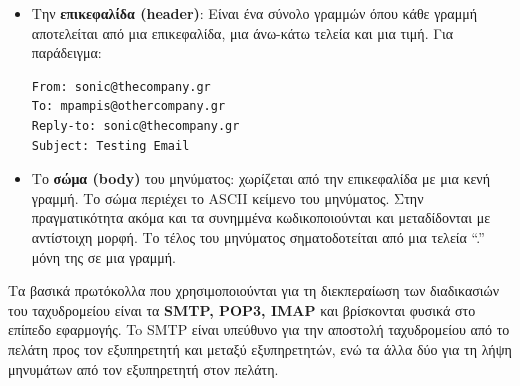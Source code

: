 \begin{itemize}
\item Την \textbf{επικεφαλίδα (header)}: Είναι ένα σύνολο γραμμών όπου κάθε γραμμή αποτελείται από μια επικεφαλίδα, μια άνω-κάτω τελεία και μια τιμή. Για παράδειγμα:

\begin{verbatim}
From: sonic@thecompany.gr
To: mpampis@othercompany.gr
Reply-to: sonic@thecompany.gr
Subject: Testing Email
\end{verbatim}

\item Το \textbf{σώμα (body)} του μηνύματος: χωρίζεται από την επικεφαλίδα με μια κενή γραμμή. Το σώμα περιέχει το ASCII κείμενο του μηνύματος. Στην πραγματικότητα ακόμα και τα συνημμένα κωδικοποιούνται και μεταδίδονται με αντίστοιχη μορφή. Το τέλος του μηνύματος σηματοδοτείται από μια τελεία ``.'' μόνη της σε μια γραμμή.
\end{itemize}

Τα βασικά πρωτόκολλα που χρησιμοποιούνται για τη διεκπεραίωση των διαδικασιών του ταχυδρομείου είναι τα \textbf{SMTP, POP3, IMAP} και βρίσκονται φυσικά στο επίπεδο εφαρμογής. To SMTP είναι υπεύθυνο για την αποστολή ταχυδρομείου από το πελάτη προς τον εξυπηρετητή και μεταξύ εξυπηρετητών, ενώ τα άλλα δύο για τη λήψη μηνυμάτων από τον εξυπηρετητή στον πελάτη.

